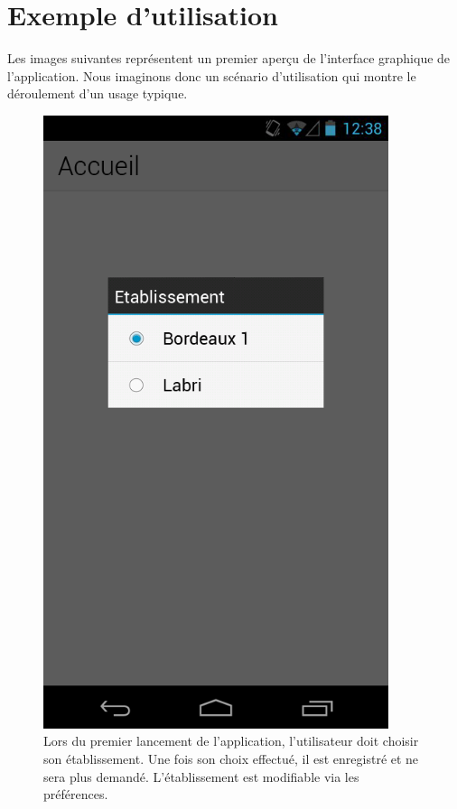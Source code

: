 \documentclass [pdftex,12pt] {report}
\begin{document}
\chapter{Exemple d'utilisation}

Les images suivantes représentent un premier aperçu de l'interface graphique de l'application. Nous imaginons donc un scénario d'utilisation qui montre le déroulement d'un usage typique. 

\begin{figure}
  \begin{minipage}[t]{8cm}
    \centering
    \includegraphics[width=0.9\textwidth]{resources/ui_preview/01}
    \caption{Lors du premier lancement de l'application, l'utilisateur doit choisir son établissement. Une fois son choix effectué, il est enregistré et ne sera plus demandé. L'établissement est modifiable via les préférences.}

\end{minipage}
\end{figure}
\end{document}

